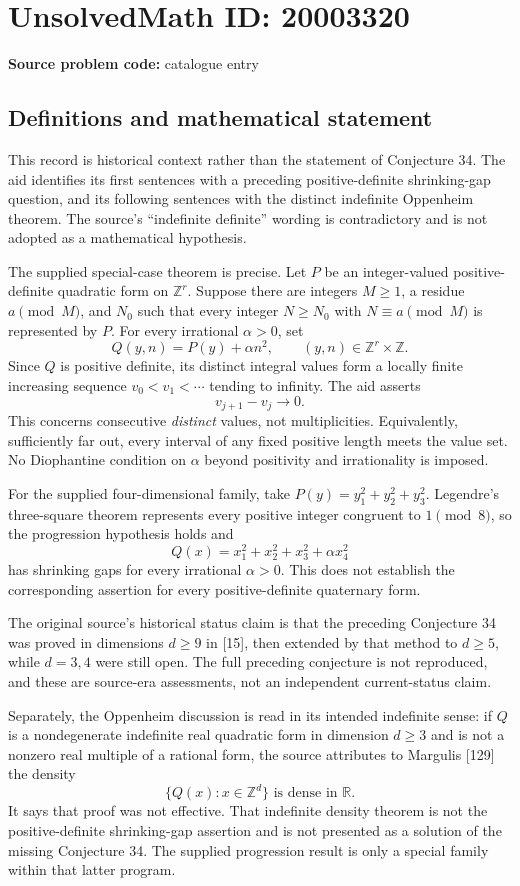 \documentclass[11pt]{article}
\newcommand{\Z}{\mathbb{Z}}
\newcommand{\R}{\mathbb{R}}
\begin{document}
\section*{UnsolvedMath ID: 20003320}
\textbf{Source problem code:} catalogue entry
\subsection{Definitions and mathematical statement}
This record is historical context rather than the statement of Conjecture 34. The aid identifies its first sentences with a preceding positive-definite shrinking-gap question, and its following sentences with the distinct indefinite Oppenheim theorem. The source's ``indefinite definite'' wording is contradictory and is not adopted as a mathematical hypothesis.

The supplied special-case theorem is precise. Let \(P\) be an integer-valued positive-definite quadratic form on \(\Z^r\). Suppose there are integers \(M\geq1\), a residue \(a\pmod M\), and \(N_0\) such that every integer \(N\geq N_0\) with \(N\equiv a\pmod M\) is represented by \(P\). For every irrational \(\alpha>0\), set
\[
 Q(y,n)=P(y)+\alpha n^2,\qquad(y,n)\in\Z^r\times\Z.
\]
Since \(Q\) is positive definite, its distinct integral values form a locally finite increasing sequence \(v_0<v_1<\cdots\) tending to infinity. The aid asserts
\[
 v_{j+1}-v_j\longrightarrow0.
\]
This concerns consecutive \emph{distinct} values, not multiplicities. Equivalently, sufficiently far out, every interval of any fixed positive length meets the value set. No Diophantine condition on \(\alpha\) beyond positivity and irrationality is imposed.

For the supplied four-dimensional family, take \(P(y)=y_1^2+y_2^2+y_3^2\). Legendre's three-square theorem represents every positive integer congruent to \(1\pmod8\), so the progression hypothesis holds and
\[
 Q(x)=x_1^2+x_2^2+x_3^2+\alpha x_4^2
\]
has shrinking gaps for every irrational \(\alpha>0\). This does not establish the corresponding assertion for every positive-definite quaternary form.

The original source's historical status claim is that the preceding Conjecture 34 was proved in dimensions \(d\geq9\) in [15], then extended by that method to \(d\geq5\), while \(d=3,4\) were still open. The full preceding conjecture is not reproduced, and these are source-era assessments, not an independent current-status claim.

Separately, the Oppenheim discussion is read in its intended indefinite sense: if \(Q\) is a nondegenerate indefinite real quadratic form in dimension \(d\geq3\) and is not a nonzero real multiple of a rational form, the source attributes to Margulis [129] the density
\[
 \{Q(x):x\in\Z^d\}\text{ is dense in }\R.
\]
It says that proof was not effective. That indefinite density theorem is not the positive-definite shrinking-gap assertion and is not presented as a solution of the missing Conjecture 34. The supplied progression result is only a special family within that latter program.
\end{document}
